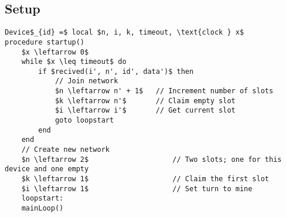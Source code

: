 \subsection{Setup} %
\label{sub:setup} 

\begin{lstlisting}[style=pseudocode,mathescape=true,caption={Pseudocode example of special case functions}]
Device$_{id} =$ local $n, i, k, timeout, \text{clock } x$
procedure startup()
	$x \leftarrow 0$
	while $x \leq timeout$ do
		if $recived(i', n', id', data')$ then
			// Join network
			$n \leftarrow n' + 1$	// Increment number of slots
			$k \leftarrow n'$		// Claim empty slot
			$i \leftarrow i'$		// Get current slot
			goto loopstart
		end
	end
	// Create new network
	$n \leftarrow 2$					// Two slots; one for this device and one empty
	$k \leftarrow 1$					// Claim the first slot
	$i \leftarrow 1$					// Set turn to mine
	loopstart:
	mainLoop()
\end{lstlisting}   
